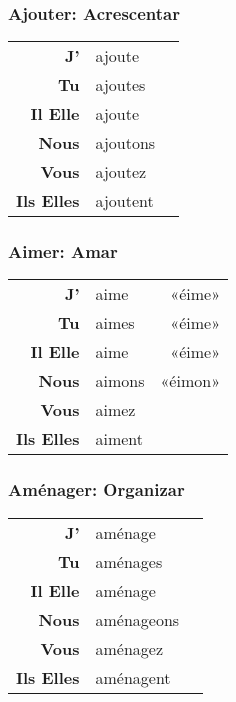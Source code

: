 \documentclass{subfiles}
\begin{document}
\begin{multicols*}{3}
        \subsubsection{Ajouter: Acrescentar}
            \begin{tabular}{r l r}
                \textbf{J'}        & ajoute   &\\
                \textbf{Tu}        & ajoutes  &\\
                \textbf{Il Elle}   & ajoute   &\\
                \textbf{Nous}      & ajoutons &\\
                \textbf{Vous}      & ajoutez  &\\
                \textbf{Ils Elles} & ajoutent &
            \end{tabular}

        \subsubsection{Aimer: Amar}
            \begin{tabular}{r l r}
                \textbf{J'}        & aime   & «éime»\\
                \textbf{Tu}        & aimes  & «éime»\\
                \textbf{Il Elle}   & aime   & «éime»\\
                \textbf{Nous}      & aimons & «éimon»\\
                \textbf{Vous}      & aimez  &\\
                \textbf{Ils Elles} & aiment &
            \end{tabular}
            
        \subsubsection{Aménager: Organizar}
            \begin{tabular}{r l r}
                \textbf{J'}        & aménage    &\\
                \textbf{Tu}        & aménages   &\\
                \textbf{Il Elle}   & aménage    &\\
                \textbf{Nous}      & aménageons &\\
                \textbf{Vous}      & aménagez   &\\
                \textbf{Ils Elles} & aménagent  &
            \end{tabular}


\end{multicols*}
\end{document}
